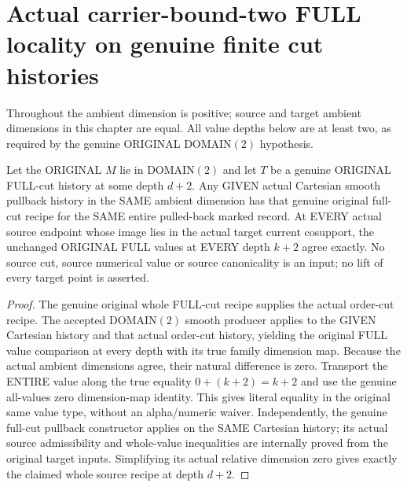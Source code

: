 \section{Actual carrier-bound-two FULL locality on genuine finite cut histories}

Throughout the ambient dimension is positive; source and target ambient
dimensions in this chapter are equal. All value depths below are at least
two, as required by the genuine ORIGINAL DOMAIN$(2)$ hypothesis.

\begin{theorem}
\label{hir:original-bound-two-full-cut-cartesian-values}
\leanok
Let the ORIGINAL $M$ lie in DOMAIN$(2)$ and let $T$ be a genuine ORIGINAL
FULL-cut history at some depth $d+2$. Any GIVEN actual Cartesian smooth
pullback history in the SAME ambient dimension has that genuine original
full-cut recipe for the SAME entire pulled-back marked record. At EVERY
actual source endpoint whose image lies in the actual target current
cosupport, the unchanged ORIGINAL FULL values at EVERY depth $k+2$ agree
exactly. No source cut, source numerical value or source canonicality is an
input; no lift of every target point is asserted.
\end{theorem}
\begin{proof}
The genuine original whole FULL-cut recipe supplies the actual order-cut
recipe. The accepted DOMAIN$(2)$ smooth producer applies to the GIVEN
Cartesian history and that actual order-cut history, yielding the original
FULL value comparison at every depth with its true family dimension map.
Because the actual ambient dimensions agree, their natural difference is
zero. Transport the ENTIRE value along the true equality
$0+(k+2)=k+2$ and use the genuine all-values zero dimension-map identity.
This gives literal equality in the original same value type, without an
alpha/numeric waiver. Independently, the genuine full-cut pullback
constructor applies on the SAME Cartesian history; its actual source
admissibility and whole-value inequalities are internally proved from the
original target inputs. Simplifying its actual relative dimension zero
gives exactly the claimed whole source recipe at depth $d+2$.
\end{proof}

